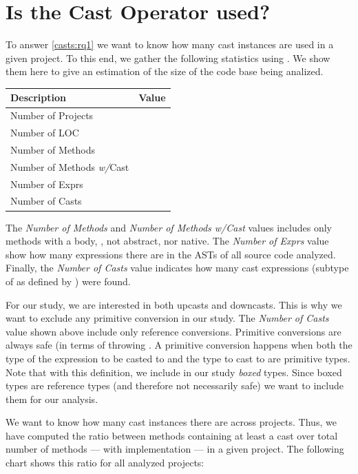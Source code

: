 \section{Is the Cast Operator used?}
\label{sec:casts:stats}

To answer \ref{casts:rq1} we want to know how many cast instances are used in a given project.
To this end, we gather the following statistics using \ql{}.
We show them here to give an estimation of the size of the code base being analized.

\begin{center}
\begin{tabular}{lr}
	Description & Value\\
	\hline
	Number of Projects & \nproject{} \\
	Number of LOC & \nloc{} \\
	Number of Methods & \nmethod{} \\
	Number of Methods \emph{w/}Cast & \nmethodwithcast{} \\
	Number of Exprs & \nexpr{} \\
	Number of Casts & \ncast{} \\
\end{tabular}
\end{center}

The \emph{Number of Methods} and \emph{Number of Methods w/Cast} values includes only methods with a body, \ie{}, not abstract, nor native.
The \emph{Number of Exprs} value show how many expressions there are in the ASTs of all source code analyzed.
Finally, the \emph{Number of Casts} value indicates how many cast expressions (subtype of  as defined by \ql{}) were found.

For our study, we are interested in both upcasts and downcasts.
This is why we want to exclude any primitive conversion in our study.
The \emph{Number of Casts} value shown above include only reference conversions.
Primitive conversions are always safe (in terms of throwing .
A primitive conversion happens when both the type of the expression to be casted to and the type to cast to are primitive types.
Note that with this definition, we include in our study \emph{boxed} types.
Since boxed types are reference types (and therefore not necessarily safe)
we want to include them for our analysis.

We want to know how many cast instances there are across projects.
Thus, we have computed the ratio between methods containing at least a cast over total number of methods --- with implementation --- in a given project.
The following chart shows this ratio for all analyzed projects:

